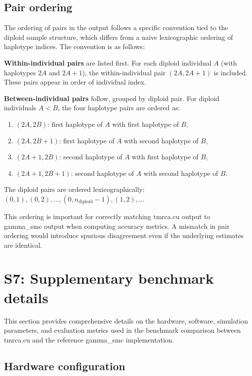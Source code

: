 \documentclass[10pt,letterpaper]{article}
\begin{document}
\subsection{Pair ordering}

The ordering of pairs in the output follows a specific convention tied to the diploid sample structure, which differs from a naive lexicographic ordering of haplotype indices. The convention is as follows:

\textbf{Within-individual pairs} are listed first. For each diploid individual $A$ (with haplotypes $2A$ and $2A+1$), the within-individual pair $(2A, 2A+1)$ is included. These pairs appear in order of individual index.

\textbf{Between-individual pairs} follow, grouped by diploid pair. For diploid individuals $A < B$, the four haplotype pairs are ordered as:
\begin{enumerate}
\item $(2A, 2B)$: first haplotype of $A$ with first haplotype of $B$,
\item $(2A, 2B+1)$: first haplotype of $A$ with second haplotype of $B$,
\item $(2A+1, 2B)$: second haplotype of $A$ with first haplotype of $B$,
\item $(2A+1, 2B+1)$: second haplotype of $A$ with second haplotype of $B$.
\end{enumerate}
The diploid pairs are ordered lexicographically: $(0,1), (0,2), \ldots, (0,n_{\mathrm{diploid}}-1), (1,2), \ldots$

This ordering is important for correctly matching tmrca.cu output to gamma\_smc output when computing accuracy metrics. A mismatch in pair ordering would introduce spurious disagreement even if the underlying estimates are identical.


\section{S7: Supplementary benchmark details}

This section provides comprehensive details on the hardware, software, simulation parameters, and evaluation metrics used in the benchmark comparison between tmrca.cu and the reference gamma\_smc implementation.

\subsection{Hardware configuration}
\end{document}
